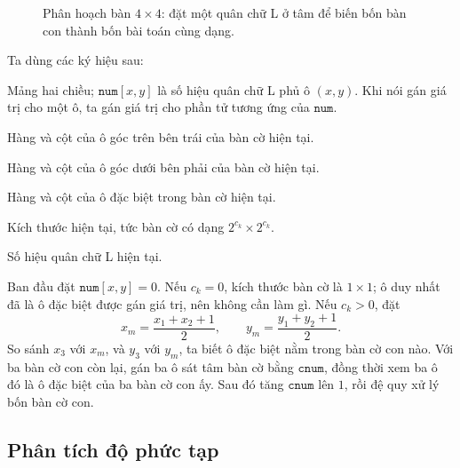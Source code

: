 \documentclass[11pt]{article}
\begin{document}
\begin{figure}[ht]
\centering
{}
\caption{Phân hoạch bàn \(4\times4\): đặt một quân chữ L ở tâm để biến bốn
bàn con thành bốn bài toán cùng dạng.}
\end{figure}

Ta dùng các ký hiệu sau:
\begin{description}[leftmargin=5.5em,style=nextline]
  \item[\(\texttt{num}\)] Mảng hai chiều; \(\texttt{num}[x,y]\) là số hiệu
  quân chữ L phủ ô \((x,y)\). Khi nói gán giá trị cho một ô, ta gán giá trị
  cho phần tử tương ứng của \(\texttt{num}\).
  \item[\(x_1,y_1\)] Hàng và cột của ô góc trên bên trái của bàn cờ hiện tại.
  \item[\(x_2,y_2\)] Hàng và cột của ô góc dưới bên phải của bàn cờ hiện tại.
  \item[\(x_3,y_3\)] Hàng và cột của ô đặc biệt trong bàn cờ hiện tại.
  \item[\(c_k\)] Kích thước hiện tại, tức bàn cờ có dạng
  \(2^{c_k}\times 2^{c_k}\).
  \item[\(\texttt{cnum}\)] Số hiệu quân chữ L hiện tại.
\end{description}

Ban đầu đặt \(\texttt{num}[x,y]=0\). Nếu \(c_k=0\), kích thước bàn cờ là
\(1\times 1\); ô duy nhất đã là ô đặc biệt được gán giá trị, nên không cần làm
gì. Nếu \(c_k>0\), đặt
\[
  x_m=\frac{x_1+x_2+1}{2},\qquad
  y_m=\frac{y_1+y_2+1}{2}.
\]
So sánh \(x_3\) với \(x_m\), và \(y_3\) với \(y_m\), ta biết ô đặc biệt nằm
trong bàn cờ con nào. Với ba bàn cờ con còn lại, gán ba ô sát tâm bàn cờ bằng
\(\texttt{cnum}\), đồng thời xem ba ô đó là ô đặc biệt của ba bàn cờ con ấy.
Sau đó tăng \(\texttt{cnum}\) lên \(1\), rồi đệ quy xử lý bốn bàn cờ con.

\subsection{Phân tích độ phức tạp}
\end{document}
